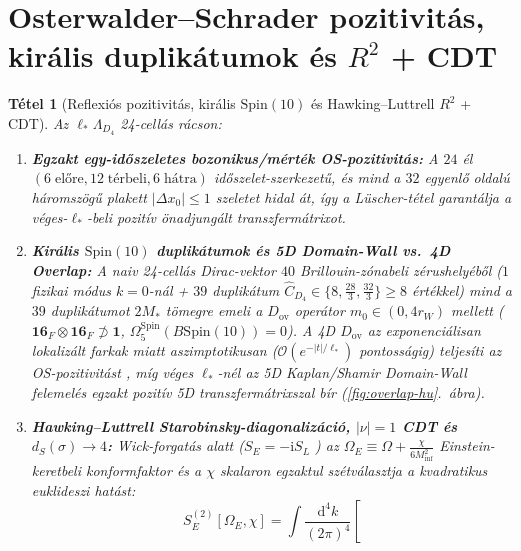 \documentclass[11pt,a4paper]{article}
\newtheorem{theorem}{Tétel}[section]
\begin{document}
\section{Osterwalder--Schrader pozitivitás, királis duplikátumok és \texorpdfstring{$R^2$}{R2} + CDT}
\label{sec:os-cdt}

\begin{theorem}[Reflexiós pozitivitás, királis $\mathrm{Spin}(10)$ és Hawking--Luttrell $R^2$ + CDT]
\label{thm:os-cdt}
Az $\ell_*\Lambda_{D_4}$ 24-cellás rácson:
\begin{enumerate}[label=(\roman*),leftmargin=1.9em,itemsep=2pt]
\item \textbf{Egzakt egy-időszeletes bozonikus/mérték OS-pozitivitás:} A $24$ él $(6\;\text{előre}, 12\;\text{térbeli}, 6\;\text{hátra})$ időszelet-szerkezetű, és mind a $32$ egyenlő oldalú háromszögű plakett $|\Delta x_0| \le 1$ szeletet hidal át, így a Lüscher-tétel \cite{Luscher1977} garantálja a véges-$\ell_*$-beli pozitív önadjungált transzfermátrixot.
\item \textbf{Királis $\mathrm{Spin}(10)$ duplikátumok és 5D Domain-Wall vs.\ 4D Overlap:} A naiv 24-cellás Dirac-vektor $40$ Brillouin-zónabeli zérushelyéből ($1$ fizikai módus $k=0$-nál + $39$ duplikátum $\widehat{C}_{D_4} \in \{8, \frac{28}{3}, \frac{32}{3}\} \ge 8$ értékkel) mind a $39$ duplikátumot $2 M_*$ tömegre emeli a $D_{\mathrm{ov}}$ operátor $m_0 \in (0, 4 r_W)$ mellett ($\mathbf{16}_F\otimes\mathbf{16}_F \not\supset \mathbf{1}$, $\Omega_5^{\mathrm{Spin}}(B\mathrm{Spin}(10)) = 0$). A 4D $D_{\mathrm{ov}}$ az exponenciálisan lokalizált farkak \cite{HernandezJansenLuscher1999} miatt aszimptotikusan ($\mathcal{O}(e^{-|t|/\ell_*})$ pontosságig) teljesíti az OS-pozitivitást \cite{Luscher2001}, míg véges $\ell_*$-nél az 5D Kaplan/Shamir Domain-Wall felemelés \cite{FurmanShamir1995} egzakt pozitív 5D transzfermátrixszal bír (\ref{fig:overlap-hu}.\ ábra).
\item \textbf{Hawking--Luttrell Starobinsky-diagonalizáció, $|\nu|=1$ CDT és $d_S(\sigma) \to 4$:} Wick-forgatás alatt ($S_E = -\mathrm{i}S_L$ \cite{HawkingLuttrell1984}) az $\Omega_E \equiv \Omega + \frac{\chi}{6 M_{\mathrm{inf}}^2}$ Einstein-keretbeli konformfaktor és a $\chi$ skalaron egzaktul szétválasztja a kvadratikus euklideszi hatást:
\begin{equation}
S_E^{(2)}[\Omega_E, \chi] = \int \frac{\mathrm{d}^4k}{(2\pi)^4}\left[

\end{equation}
\end{enumerate}
\end{theorem}
\end{document}
